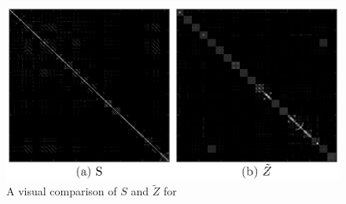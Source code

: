 %
\begin{figure}[t]
    \centering
        \includegraphics[width = 0.8\linewidth]{figure/COIL20_block.eps}
        \caption{A visual comparison of $S$ and $\tilde{Z}$ for \coil}
        \label{figure:COIL20_block}
        \vspace{-5mm}
\end{figure}

